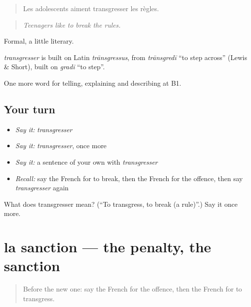 \begin{quote}
Les adolescents aiment transgresser les règles.
\end{quote}

\begin{quote}
\emph{Teenagers like to break the rules.}
\end{quote}

Formal, a little literary.

\begin{cousinweb}
\emph{transgresser} is built on Latin \emph{trānsgressus}, from \emph{trānsgredī} \textquotedblleft{}to step across\textquotedblright{} (Lewis \& Short), built on \emph{gradī} \textquotedblleft{}to step\textquotedblright{}.
\end{cousinweb}

\begin{grammarlens}[title={What you've built}]
One more word for telling, explaining and describing at B1.
\end{grammarlens}

\subsection*{Your turn}
\begin{itemize}
\raggedright
  \item \emph{Say it:} \emph{transgresser}
  \item \emph{Say it:} \emph{transgresser}, once more
  \item \emph{Say it:} a sentence of your own with \emph{transgresser}
  \item \emph{Recall:} say the French for to break, then the French for the offence, then say \emph{transgresser} again
\end{itemize}

\begin{tcolorbox}[breakable,colback=teal!4,colframe=teal!35!black,title={Before you move on}]
What does transgresser mean? (\textquotedblleft{}To transgress, to break (a rule)\textquotedblright{}.) Say it once more.
\end{tcolorbox}
\section[la sanction]{la sanction — the penalty, the sanction}

\label{lesson:FR-C382-sanction}



\begin{quote}
Before the new one: say the French for the offence, then the French for to transgress.
\end{quote}

